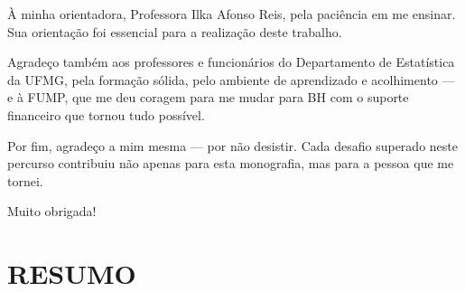 À minha orientadora, Professora Ilka Afonso Reis, pela paciência em me ensinar. Sua orientação foi essencial para a realização deste trabalho.

Agradeço também aos professores e funcionários do Departamento de Estatística da UFMG, pela formação sólida, pelo ambiente de aprendizado e acolhimento —  e à FUMP, que me deu coragem para me mudar para BH com o suporte financeiro que tornou tudo possível.

Por fim, agradeço a mim mesma — por não desistir. Cada desafio superado neste percurso contribuiu não apenas para esta monografia, mas para a pessoa que me tornei.

Muito obrigada!

\newpage


\pagestyle{fancy}

\section*{RESUMO}


